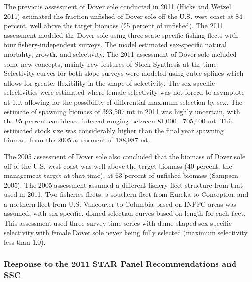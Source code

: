 \documentclass[11pt,
  english,
  a4paper,
]{article}
\begin{document}
The previous assessment of Dover sole conducted in 2011 {(Hicks and Wetzel 2011)\leavevmode\tagmcend\tagstructend} estimated the fraction unfished of Dover sole off the U.S. west coast at 84 percent, well above the target biomass (25 percent of unfished). The 2011 assessment modeled the Dover sole using three state-specific fishing fleets with four fishery-independent surveys. The model estimated sex-specific natural mortality, growth, and selectivity. The 2011 assessment of Dover sole included some new concepts, mainly new features of Stock Synthesis at the time. Selectivity curves for both slope surveys were modeled using cubic splines which allows for greater flexibility in the shape of selectivity. The sex-specific selectivities were estimated where female selectivity was not forced to asymptote at 1.0, allowing for the possibility of differential maximum selection by sex. The estimate of spawning biomass of 393,507 mt in 2011 was highly uncertain, with the 95 percent confidence interval ranging between 81,000 - 705,000 mt. This estimated stock size was considerably higher than the final year spawning biomass from the 2005 assessment of 188,987 mt.

\leavevmode\tagmcend\tagstructend\par


The 2005 assessment of Dover sole also concluded that the biomass of Dover sole off of the U.S. west coast was well above the target biomass (40 percent, the management target at that time), at 63 percent of unfished biomass {(Sampson 2005)\leavevmode\tagmcend\tagstructend}. The 2005 assessment assumed a different fishery fleet structure from that used in 2011. Two fisheries fleets, a southern fleet from Eureka to Conception and a northern fleet from U.S. Vancouver to Columbia based on INPFC areas was assumed, with sex-specific, domed selection curves based on length for each fleet. This assessment used three survey time-series with dome-shaped sex-specific selectivity with female Dover sole never being fully selected (maximum selectivity less than 1.0).

\leavevmode\tagmcend\tagstructend\par


\hypertarget{response-to-the-2011-star-panel-recommendations-and-ssc}{%
\subsubsection{Response to the 2011 STAR Panel Recommendations and SSC}\label{response-to-the-2011-star-panel-recommendations-and-ssc}}
\end{document}
